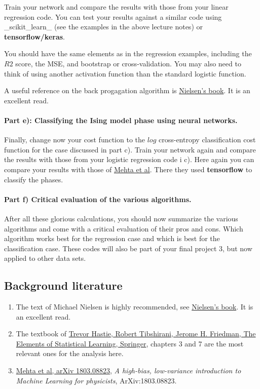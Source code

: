 \documentclass[%
oneside,                 %
final,                   %
10pt]{article}
\begin{document}
Train your network and compare the results with those from your linear regression code. 
You can test your results against a similar code using _scikit_learn_ (see the examples in the above lecture notes) or \textbf{tensorflow/keras}. 

You should have the same elements as in the regression examples, including the $R2$ score, the MSE, and bootstrap or cross-validation.
You may also need to think of using another activation function than the standard logistic function.

A useful reference on the back progagation algorithm is \href{{http://neuralnetworksanddeeplearning.com/}}{Nielsen's book}. It is an excellent read.

\paragraph{Part e): Classifying the Ising model phase using neural networks.}
Finally, change now your cost function to the $log$ cross-entropy classification cost function for the case discussed in part c). Train your network again and
compare the results with those from your logistic  regression code i c). 
Here again you can compare your results with those of \href{{https://physics.bu.edu/~pankajm/ML-Notebooks/HTML/NB_CIX-DNN_ising_TFlow.html}}{Mehta et al}. There they used \textbf{tensorflow} to classify the phases. 



\paragraph{Part f) Critical evaluation of the various algorithms.}
After all these glorious calculations, you should now summarize the various algorithms and come with a critical evaluation of their pros and cons. Which algorithm works best for the regression case and which is best for the classification case. These codes will also be part of your final project 3, but now applied to other data sets.




\subsection{Background literature}

\begin{enumerate}
\item The text of Michael Nielsen is highly recommended, see \href{{http://neuralnetworksanddeeplearning.com/}}{Nielsen's book}. It is an excellent read.

\item The textbook of \href{{https://www.springer.com/gp/book/9780387848570}}{Trevor Hastie, Robert Tibshirani, Jerome H. Friedman, The Elements of Statistical Learning, Springer}, chapters 3 and 7 are the most relevant ones for the analysis here. 

\item \href{{https://arxiv.org/abs/1803.08823}}{Mehta et al, arXiv 1803.08823}, \emph{A high-bias, low-variance introduction to Machine Learning for physicists}, ArXiv:1803.08823.
\end{enumerate}
\end{document}
